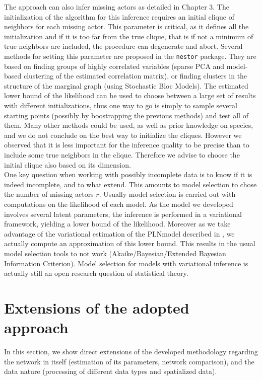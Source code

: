 The approach can also infer missing actors as detailed in Chapter 3. The initialization of the algorithm for this inference requires an initial clique of neighbors for each missing actor. This parameter is critical, as it defines all the initialization and if it is too far from the true clique, that is if not a minimum of true neighbors are included, the procedure can degenerate and abort. Several methods for setting this parameter are proposed in the \texttt{nestor} package. They are based on finding groups of highly correlated variables (sparse PCA and model-based clustering of the estimated correlation matrix), or finding clusters in the structure of the marginal graph (using Stochastic Bloc Models). The estimated lower bound of the likelihood can be used to choose between a large set of results with different initializations, thus one way to go is simply to sample several starting points (possibly by boostrapping the previous methods) and test all of them. Many other methods could be used, as well as prior knowledge on species, and we do not conclude on the best way to initialize the cliques. However we observed that it is less important for the inference quality to be precise than to include some true neighbors in the clique. Therefore we advise to choose the initial clique also based on its dimension.\\

One key question when working with possibly incomplete data is to know if it is indeed incomplete, and to what extend. This amounts to model selection to chose the number of missing actors $r$.  Usually model selection is carried out with computations on the likelihood of each model. As the model we developed involves several latent parameters, the inference is performed in a variational framework, yielding a lower bound of the likelihood. Moreover as we take advantage of the variational estimation of the PLNmodel described in \citet{CMR18}, we actually compute an approximation of this lower bound. This results in the usual model selection tools to not work (Akaike/Bayesian/Extended Bayesian Information Criterion). Model selection for models with variational inference is actually still an open research question of statistical theory.
 
\section{Extensions of the adopted approach}
In this section, we show direct extensions of the developed methodology regarding the network in itself (estimation of its parameters, network comparison), and the data nature (processing of different data types and spatialized data).
